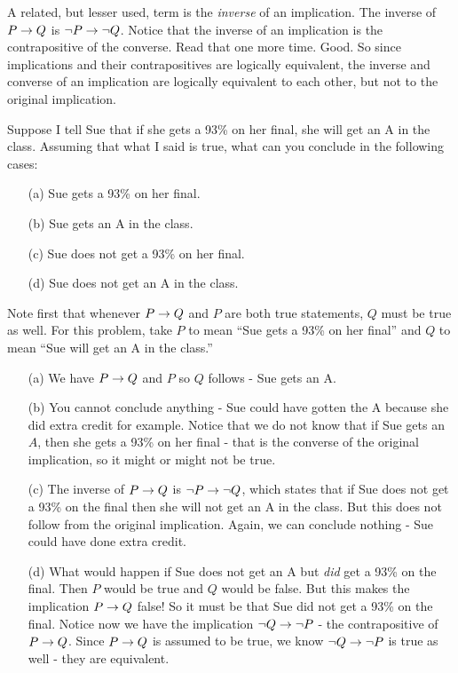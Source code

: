 \documentclass[12pt]{article}
\begin{document}
A related, but lesser used, term is the {\em inverse} of an implication.  The inverse of $P \rightarrow Q$ is $\neg P \rightarrow \neg Q$.  Notice that the inverse of an implication is the contrapositive of the converse.  Read that one more time.   Good.  So since implications and their contrapositives are logically equivalent, the inverse and converse of an implication are logically equivalent to each other, but not to the original implication.



\begin{example}
  Suppose I tell Sue that if she gets a 93\% on her final, she will get an A in the class.  Assuming that what I said is true, what can you conclude in the following cases:
  \begin{itemize}
    \item[(a)] Sue gets a 93\% on her final.
    \item[(b)] Sue gets an A in the class.
    \item[(c)] Sue does not get a 93\% on her final.
    \item[(d)] Sue does not get an A in the class.
  \end{itemize}
  \begin{solution} Note first that whenever $P \rightarrow Q$ and $P$ are both true statements, $Q$ must be true as well.  For this problem, take $P$ to mean ``Sue gets a 93\% on her final'' and $Q$ to mean ``Sue will get an A in the class.''
    \begin{itemize}
      \item[(a)] We have $P \rightarrow Q$ and $P$ so $Q$ follows - Sue gets an A.
      \item[(b)] You cannot conclude anything - Sue could have gotten the A because she did extra credit for example.  Notice that we do not know that if Sue gets an $A$, then she gets a 93\% on her final - that is the converse of the original implication, so it might or might not be true.
      \item[(c)] The inverse of $P \rightarrow Q$ is $\neg P \rightarrow \neg Q$, which states that if Sue does not get a 93\% on the final then she will not get an A in the class.  But this does not follow from the original implication.  Again, we can conclude nothing - Sue could have done extra credit.
      \item[(d)] What would happen if Sue does not get an A but {\em did} get a 93\% on the final.  Then $P$ would be true and $Q$ would be false.  But this makes the implication $P \rightarrow Q$ false!  So it must be that Sue did not get a 93\% on the final.  Notice now we have the implication $\neg Q \rightarrow \neg P$ - the contrapositive of $P \rightarrow Q$.  Since $P \rightarrow Q$ is assumed to be true, we know $\neg Q \rightarrow \neg P$ is true as well - they are equivalent.
    \end{itemize}
  \end{solution}
\end{example}
\end{document}

